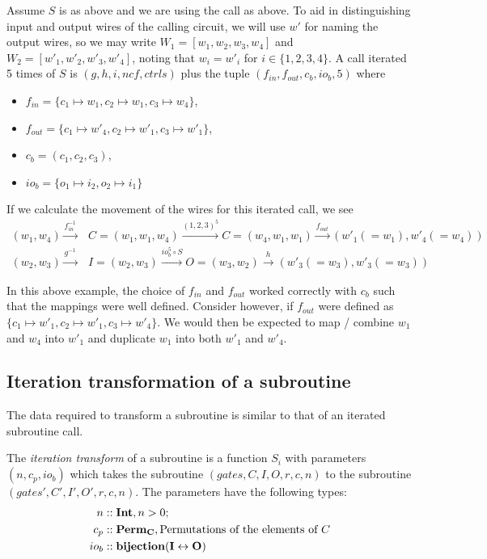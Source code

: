 \begin{example}
\end{example}
Assume $S$ is as above and we are using the call as above. To aid in distinguishing input and
output wires of the calling circuit, we will use $w'$ for naming the output wires, so we may write
$W_1 = [w_1,w_2,w_3,w_4]$ and $W_2=[w'_1,w'_2,w'_3,w'_4]$, noting that $w_i = w'_i$ for
$i\in\{1,2,3,4\}$. A call iterated 5 times of $S$ is $(g,h,i,ncf,ctrls)$ plus the tuple
$(f_{in},f_{out},c_b,io_b,5)$ where
\begin{itemize}
  \item $f_{in} = \{c_1\mapsto w_1, c_2 \mapsto w_1, c_3 \mapsto w_4\}$,
  \item $f_{out} = \{c_1\mapsto w'_4, c_2 \mapsto w'_1, c_3 \mapsto w'_1\}$,
  \item $c_b = (c_1,c_2,c_3)$,
  \item $io_b = \{o_1\mapsto i_2, o_2\mapsto i_1\}$
\end{itemize}
If we calculate the movement of the wires for this iterated call, we see
\begin{align}
  (w_1,w_4)\xrightarrow{f_{in}^{-1}} &C=(w_1,w_1,w_4) \xrightarrow{(1,2,3)^5}
    C=(w_4,w_1,w_1) \xrightarrow{f_{out}} (w'_1(=w_1),w'_4(=w_4))\\
  (w_2,w_3)\xrightarrow{g^{-1}} &I=(w_2,w_3) \xrightarrow{io_b^5\circ S}
    O=(w_3,w_2) \xrightarrow{h} (w'_3(=w_3),w'_3(=w_3))
\end{align}

In this above example, the choice of $f_{in}$ and $f_{out}$ worked correctly with $c_b$ such that
the mappings were well defined. Consider however, if $f_{out}$ were defined as $\{c_1\mapsto w'_1,
c_2 \mapsto w'_1, c_3 \mapsto w'_4\}$. We would then be expected to map / combine $w_1$ and $w_4$
into $w'_1$ and duplicate $w_1$ into both $w'_1$ and $w'_4$.


\subsection{Iteration transformation of a subroutine} %
\label{sub:iteration_transformation_of_a_subroutine}

The data required to transform a subroutine is similar to that of an iterated subroutine call.

\begin{definition}\label{def:iteration_transform}
  The \emph{iteration transform} of a subroutine is a function $S_i$ with parameters $(n,c_p,io_b)$
  which takes the subroutine $(gates,C,I,O,r,c,n)$ to the subroutine $(gates',C',I',O',r,c,n)$. The
  parameters have the following types:
  \begin{align*}
    n&::\mathbf{{Int}}, n>0;\\
    c_p&::\mathbf{{Perm_C}}, \text{Permutations of the elements of }C\\
    io_b&::\mathbf{{bijection(I\leftrightarrow O)}}
  \end{align*}
\end{definition}

